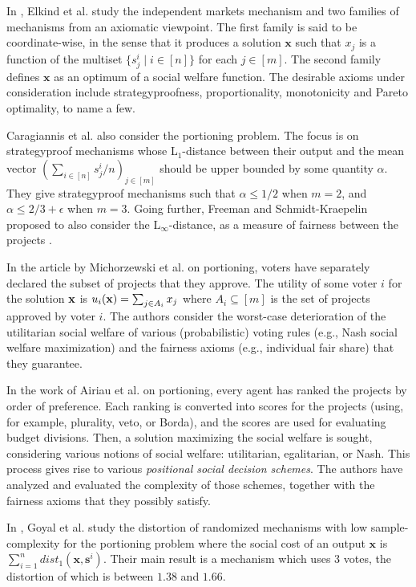 \documentclass{article}
\begin{document}
In \cite{EST23}, Elkind et al. study the independent markets mechanism and two families of mechanisms from an axiomatic viewpoint. The first family is said to be coordinate-wise, in the sense that it produces a solution $\textbf{x}$ such that $x_j$ is a function of the multiset $\{s^i_j \mid i \in [n]\}$ for each $j \in [m]$. The second family defines $\textbf{x}$ as an optimum of a social welfare function. The desirable axioms under consideration include strategyproofness, proportionality, monotonicity and Pareto optimality, to name a few.  

Caragiannis et al. \cite{CCP24} also consider the portioning problem. The focus is on strategyproof mechanisms whose L$_1$-distance between their output and the mean vector $(\sum_{i\in [n]}s^i_j/n)_{j \in [m]}$ should be upper bounded by some quantity $\alpha$. They give strategyproof mechanisms such that $\alpha \leq 1/2$ when $m=2$, and $\alpha \leq 2/3+\epsilon$ when $m=3$. Going further, Freeman and Schmidt{-}Kraepelin \cite{FS24} proposed to also consider the L$_\infty$-distance, as a measure of fairness between the projects \cite{FS24}.


In the article by Michorzewski et al. \cite{MPS20} on portioning, 
voters have separately declared the subset of projects that they approve. The utility of some voter $i$ for the solution ${\bf x}$ is $u_i({\bf x})=\sum_{j\in A_i} x_j$ where $A_i \subseteq [m]$ is the set of projects approved by voter $i$. The authors consider the worst-case deterioration of the utilitarian social welfare of various (probabilistic) voting rules (e.g., Nash social welfare maximization) and the fairness axioms (e.g., individual fair share) that they guarantee. 



In the work of Airiau et al. \cite{AACKLP23} on portioning, every agent  has ranked the projects by order of preference. Each ranking is converted into scores for the projects (using, for example, plurality, veto, or Borda), and the scores are used for evaluating budget divisions. Then, a solution maximizing the social welfare is sought, considering  various notions of social welfare: utilitarian, egalitarian, or Nash. This process gives rise to various {\em positional social decision schemes}. The authors have analyzed and evaluated the %
complexity of those schemes, together with the fairness axioms that they possibly satisfy. %

In \cite{GoyalSSG23}, Goyal et al. study the distortion of randomized mechanisms with low sample-complexity 
for the portioning problem where the social cost of an output $\textbf{x}$ is $\sum_{i=1}^n dist_1(\textbf{x},\textbf{s}^i)$. Their main result is a mechanism which uses 3 votes, the distortion of which is between $1.38$ and $1.66$.    
\end{document}
